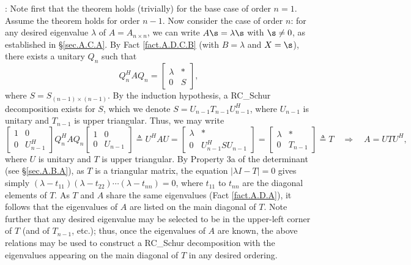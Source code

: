 \/: Note first that the theorem holds
(trivially) for the base case of order $n=1$.  Assume the theorem
holds for order $n-1$.  Now consider the case of order $n$: for any
desired eigenvalue $\lambda$ of $A=A_{n\times n}$, we can write
$A\s=\lambda \s$ with $\s\ne 0$, as established in \S \ref{sec.A.C.A}.
By Fact \ref{fact.A.D.C.B} (with $B=\lambda$ and $X=\s$), there exists
a unitary $Q_{n}$ such that
\begin{equation*}
Q_{n}^{H} A Q_{n} =\begin{bmatrix} \lambda & * \\ 0 & S \end{bmatrix},
\end{equation*}
where $S=S_{(n-1)\times (n-1)}$.  By the induction hypothesis, a RC_Schur
decomposition exists for $S$, which we denote $S=U_{n-1} T_{n-1}
U^{H}_{n-1}$, where $U_{n-1}$ is unitary and $T_{n-1}$ is upper
triangular.  Thus, we may write
\begin{equation*}
    \begin{bmatrix} 1 & 0 \\ 0 & U^{H}_{n-1} \end{bmatrix} Q_{n}^{H} A Q_{n}
		\begin{bmatrix} 1 & 0 \\ 0 & U_{n-1}     \end{bmatrix} \triangleq U^{H} A U =
		\begin{bmatrix} \lambda & * \\ 0 & U^{H}_{n-1} S U_{n-1} \end{bmatrix} =
		\begin{bmatrix} \lambda & * \\ 0 & T_{n-1} \end{bmatrix} \triangleq
		    T \quad \Rightarrow \quad A = U T U^{H},
\end{equation*}
where $U$ is unitary and $T$ is upper triangular.  By Property 3a of
the determinant (see \S \ref{sec.A.B.A}), as $T$ is a triangular
matrix, the equation $|\lambda I-T|=0$ gives simply
$(\lambda-t_{11})(\lambda-t_{22})\cdots(\lambda-t_{nn})=0$, where
$t_{11}$ to $t_{nn}$ are the diagonal elements of $T$.  As $T$ and $A$
share the same eigenvalues (Fact \ref{fact.A.D.A}), it follows that
the eigenvalues of $A$ are listed on the main diagonal of $T$.  Note
further that any desired eigenvalue may be selected to be in the
upper-left corner of $T$ (and of $T_{n-1}$, etc.); thus, once the
eigenvalues of $A$ are known, the above relations may be used to
construct a RC_Schur decomposition with the eigenvalues appearing on the
main diagonal of $T$ in any desired ordering.   \endproof \vskip0.1in

